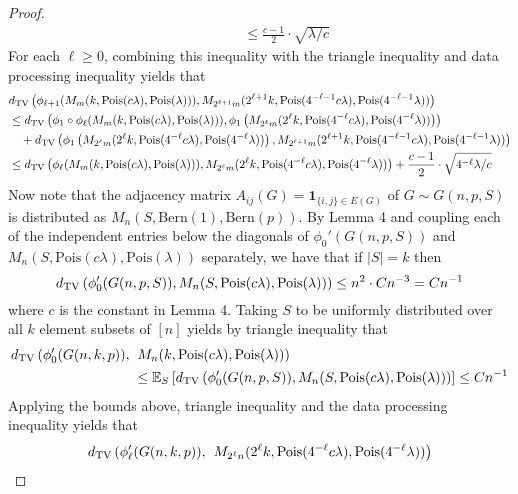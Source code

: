 \documentclass[11pt]{article}
\begin{document}
\begin{proof}
\begin{align*}
&\quad \quad \quad \le \frac{c - 1}{2} \cdot \sqrt{\lambda/c}
\end{align*}
For each $\ell \ge 0$, combining this inequality with the triangle inequality and data processing inequality yields that
\begin{align*}
&d_{\text{TV}}\left( \phi_{\ell+1}(M_m(k, \text{Pois}(c\lambda), \text{Pois}(\lambda))), M_{2^{\ell+1} m}(2^{\ell+1} k, \text{Pois}(4^{-\ell-1} c\lambda), \text{Pois}(4^{-\ell-1}\lambda)) \right) \\
&\le d_{\text{TV}}\left( \phi_1 \circ \phi_{\ell}(M_m(k, \text{Pois}(c\lambda), \text{Pois}(\lambda))), \phi_1\left( M_{2^{\ell} m}(2^{\ell} k, \text{Pois}(4^{-\ell} c\lambda), \text{Pois}(4^{-\ell}\lambda)) \right) \right) \\
&\quad + d_{\text{TV}}\left( \phi_1\left( M_{2^{\ell} m}(2^{\ell} k, \text{Pois}(4^{-\ell} c\lambda), \text{Pois}(4^{-\ell}\lambda)) \right), M_{2^{\ell+1} m}(2^{\ell+1} k, \text{Pois}(4^{-\ell-1} c\lambda), \text{Pois}(4^{-\ell-1}\lambda)) \right) \\
&\le d_{\text{TV}}\left( \phi_{\ell}(M_m(k, \text{Pois}(c\lambda), \text{Pois}(\lambda))), M_{2^{\ell} m}(2^{\ell} k, \text{Pois}(4^{-\ell} c\lambda), \text{Pois}(4^{-\ell}\lambda)) \right)  + \frac{c - 1}{2} \cdot \sqrt{4^{-\ell} \lambda/c}
\end{align*}
Now note that the adjacency matrix $A_{ij}(G) = \mathbf{1}_{\{i, j \} \in E(G)}$ of $G \sim G(n, p, S)$ is distributed as $M_n(S, \text{Bern}(1), \text{Bern}(p))$. By Lemma 4 and coupling each of the independent entries below the diagonals of $\phi_0'(G(n, p, S))$ and $M_n(S, \text{Pois}(c\lambda), \text{Pois}(\lambda))$ separately, we have that if $|S| = k$ then
$$d_{\text{TV}}\left( \phi_0'(G(n, p, S)), M_n(S, \text{Pois}(c\lambda), \text{Pois}(\lambda)) \right) \le n^2 \cdot C n^{-3} = Cn^{-1}$$
where $c$ is the constant in Lemma 4. Taking $S$ to be uniformly distributed over all $k$ element subsets of $[n]$ yields by triangle inequality that
\begin{align*}
d_{\text{TV}}\left( \phi_0'(G(n, k, p)), \right. &\left. M_n(k, \text{Pois}(c\lambda), \text{Pois}(\lambda)) \right) \\
&\le \mathbb{E}_S \left[ d_{\text{TV}}\left( \phi_0'(G(n, p, S)), M_n(S, \text{Pois}(c\lambda), \text{Pois}(\lambda)) \right) \right] \le Cn^{-1}
\end{align*}
Applying the bounds above, triangle inequality and the data processing inequality yields that
\begin{align*}
\TV\left( \phi_\ell'(G(n, k, p)), \right. &\left. M_{2^{\ell} n}(2^{\ell} k, \text{Pois}(4^{-\ell} c\lambda), \text{Pois}(4^{-\ell}\lambda)) \right) \\

\end{align*}
\end{proof}
\end{document}
